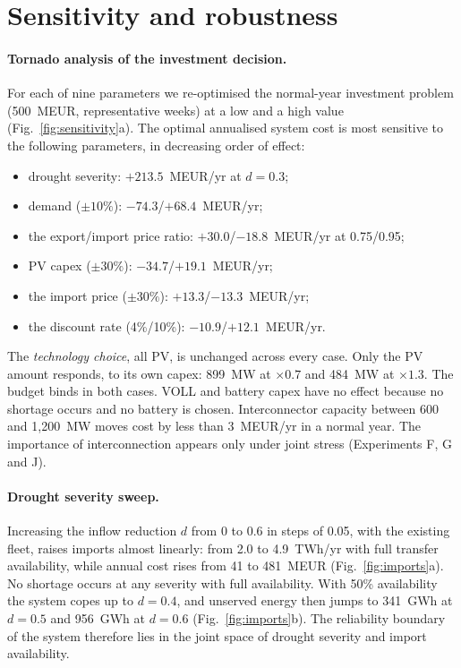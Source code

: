 \section{Sensitivity and robustness}
\label{sec:sensitivity}

\paragraph{Tornado analysis of the investment decision.} For each of nine parameters we re-optimised the
normal-year investment problem (500~MEUR, representative weeks) at a low and a high value
(Fig.~\ref{fig:sensitivity}a). The optimal annualised system cost is most sensitive to the following
parameters, in decreasing order of effect:
\begin{itemize}
\item drought severity: $+213.5$~MEUR/yr at $d=0.3$;
\item demand ($\pm10\%$): $-74.3$/$+68.4$~MEUR/yr;
\item the export/import price ratio: $+30.0$/$-18.8$~MEUR/yr at 0.75/0.95;
\item PV capex ($\pm30\%$): $-34.7$/$+19.1$~MEUR/yr;
\item the import price ($\pm30\%$): $+13.3$/$-13.3$~MEUR/yr;
\item the discount rate (4\%/10\%): $-10.9$/$+12.1$~MEUR/yr.
\end{itemize}
The \emph{technology choice}, all PV, is unchanged across every case. Only the PV amount responds, to its own
capex: 899~MW at $\times0.7$ and 484~MW at $\times1.3$. The budget binds in both cases. VOLL and battery capex
have no effect because no shortage occurs and no battery is chosen. Interconnector capacity between 600 and
1{,}200~MW moves cost by less than 3~MEUR/yr in a normal year. The importance of interconnection appears only
under joint stress (Experiments F, G and J).

\paragraph{Drought severity sweep.} Increasing the inflow reduction $d$ from 0 to 0.6 in steps of 0.05, with
the existing fleet, raises imports almost linearly: from 2.0 to 4.9~TWh/yr with full transfer availability,
while annual cost rises from 41 to 481~MEUR (Fig.~\ref{fig:imports}a). No shortage occurs at any severity with
full availability. With 50\% availability the system copes up to $d=0.4$, and unserved energy then jumps to
341~GWh at $d=0.5$ and 956~GWh at $d=0.6$ (Fig.~\ref{fig:imports}b). The reliability boundary of the system
therefore lies in the joint space of drought severity and import availability.

